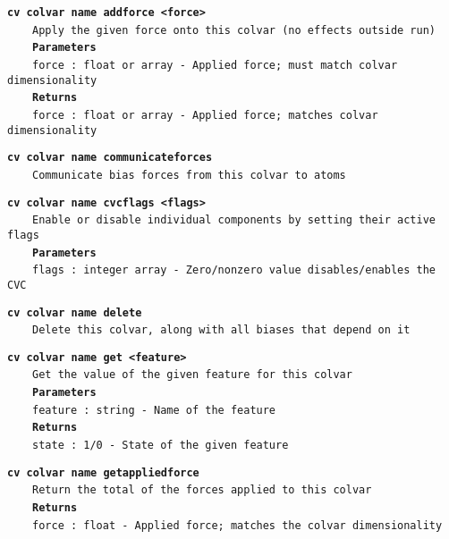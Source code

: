 \begin{mdexampleinput}{}
\texttt{\textbf{cv colvar name addforce <force>}}
\\
\-~~~~\texttt{Apply the given force onto this colvar (no effects outside run)}
\\
\-~~~~\texttt{\textbf{Parameters}}
\\
\-~~~~\texttt{force : float or array - Applied force; must match colvar dimensionality}
\\
\-~~~~\texttt{\textbf{Returns}}
\\
\-~~~~\texttt{force : float or array - Applied force; matches colvar dimensionality}
\end{mdexampleinput}
\begin{mdexampleinput}{}
\texttt{\textbf{cv colvar name communicateforces}}
\\
\-~~~~\texttt{Communicate bias forces from this colvar to atoms}
\end{mdexampleinput}
\begin{mdexampleinput}{}
\texttt{\textbf{cv colvar name cvcflags <flags>}}
\\
\-~~~~\texttt{Enable or disable individual components by setting their active flags}
\\
\-~~~~\texttt{\textbf{Parameters}}
\\
\-~~~~\texttt{flags : integer array - Zero/nonzero value disables/enables the CVC}
\end{mdexampleinput}
\begin{mdexampleinput}{}
\texttt{\textbf{cv colvar name delete}}
\\
\-~~~~\texttt{Delete this colvar, along with all biases that depend on it}
\end{mdexampleinput}
\begin{mdexampleinput}{}
\texttt{\textbf{cv colvar name get <feature>}}
\\
\-~~~~\texttt{Get the value of the given feature for this colvar}
\\
\-~~~~\texttt{\textbf{Parameters}}
\\
\-~~~~\texttt{feature : string - Name of the feature}
\\
\-~~~~\texttt{\textbf{Returns}}
\\
\-~~~~\texttt{state : 1/0 - State of the given feature}
\end{mdexampleinput}
\begin{mdexampleinput}{}
\texttt{\textbf{cv colvar name getappliedforce}}
\\
\-~~~~\texttt{Return the total of the forces applied to this colvar}
\\
\-~~~~\texttt{\textbf{Returns}}
\\
\-~~~~\texttt{force : float - Applied force; matches the colvar dimensionality}
\end{mdexampleinput}
